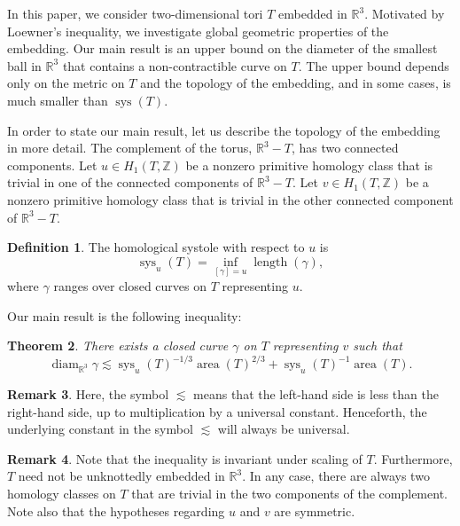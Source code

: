 \documentclass[12pt]{amsart}
\DeclareMathOperator*{\Area}{area}
\DeclareMathOperator*{\diam}{diam}
\DeclareMathOperator*{\length}{length}
\DeclareMathOperator*{\sys}{sys}
\newtheorem{theorem}{Theorem}[section]
\theoremstyle{definition}
\newtheorem{definition}[theorem]{Definition}
\newtheorem{remark}[theorem]{Remark}
\begin{document}
In this paper, we consider two-dimensional tori $T$ embedded in $\mathbb{R}^3$. Motivated by Loewner's inequality, we investigate global geometric properties of the embedding. Our main result is an upper bound on the diameter of the smallest ball in $\mathbb{R}^3$ that contains a non-contractible curve on $T$. The upper bound depends only on the metric on $T$ and the topology of the embedding, and in some cases, is much smaller than $\sys(T)$. 

In order to state our main result, let us describe the topology of the embedding in more detail. The complement of the torus, $\mathbb{R}^3-T$, has two connected components. Let $u\in H_1(T,\mathbb{Z})$ be a nonzero primitive homology class that is trivial in one of the connected components of $\mathbb{R}^3-T$. Let $v\in H_1(T,\mathbb{Z})$ be a nonzero primitive homology class that is trivial in the other connected component of $\mathbb{R}^3-T$.

\begin{definition} The homological systole with respect to $u$ is $$\textstyle\sys_u(T)=\displaystyle\inf_{[\gamma]=u}\length(\gamma),$$ where $\gamma$ ranges over closed curves on $T$ representing $u$.
\end{definition}

Our main result is the following inequality:

\begin{theorem}\label{main embedding theorem} There exists a closed curve $\gamma$ on $T$ representing $v$ such that $$\textstyle\diam_{\mathbb{R}^3} \gamma\lesssim \sys_{u}(T)^{-1/3}\Area(T)^{2/3}+\sys_{u}(T)^{-1}\Area(T).$$ 
\end{theorem}

\begin{remark} Here, the symbol $\lesssim$ means that the left-hand side is less than the right-hand side, up to multiplication by a universal constant. Henceforth, the underlying constant in the symbol $\lesssim$ will always be universal.
\end{remark}

\begin{remark} Note that the inequality is invariant under scaling of $T$. Furthermore, $T$ need not be unknottedly embedded in $\mathbb{R}^3$. In any case, there are always two homology classes on $T$ that are trivial in the two components of the complement. Note also that the hypotheses regarding $u$ and $v$ are symmetric.
\end{remark}
\end{document}
